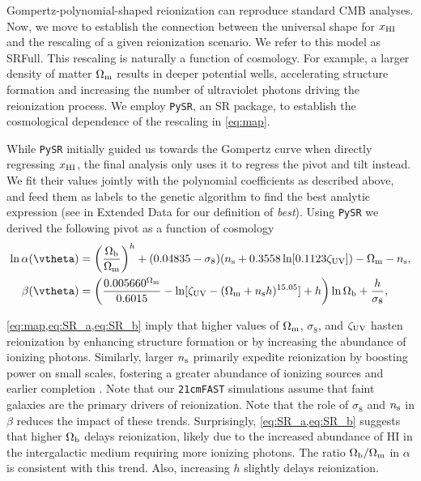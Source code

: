 Gompertz-polynomial-shaped reionization can reproduce standard CMB analyses.
Now, we move to establish the connection
between the universal shape for $x_{\mathrm{HI}}$ and the rescaling of a given
reionization scenario. We refer to this model as SRFull.
This rescaling is naturally a function of cosmology.
For example, a larger density of matter $\Omega_\mathrm{m}$ results in deeper
potential wells, accelerating structure formation and increasing the
number of ultraviolet photons driving the reionization process.
We employ \texttt{PySR}, an SR package, to establish the cosmological dependence
of the rescaling in \cref{eq:map}.

While \texttt{PySR} initially guided us towards the Gompertz curve when
directly regressing $x_{\mathrm{HI}}$, the final analysis only uses it to regress
the pivot and tilt instead.
We fit their values jointly with the polynomial coefficients as
described above, and feed them as labels to the genetic algorithm to
find the best analytic expression (see  in Extended
Data for our definition of \emph{best}).
Using \texttt{PySR} we derived the following pivot as a function of
cosmology
%
\begin{align}
\label{eq:SR_a}
\ln\ap(\vtheta) &= \left(\frac{\Omegab}{\Omegam}\right)^h + (0.04835 - \sigma_8) (\ns + 0.3558 \ln[0.1123 \zetaUV])  - \Omegam - \ns, \\
\label{eq:SR_b}
\beta(\vtheta) &=  \left( \frac{0.005660^{\Omegam}}{0.6015} - \ln[\zetaUV - (\Omegam + \ns h)^{15.05} ]+ h \right) \ln{\Omegab} + \frac{h}{\sigma_8},
\end{align} 

\cref{eq:map,eq:SR_a,eq:SR_b} imply that higher values of $\Omega_\mathrm{m}$, $\sigma_8$, 
and $\zeta_\mathrm{UV}$ hasten reionization by enhancing structure
formation or by increasing the abundance of ionizing photons. 
Similarly, larger $n_\mathrm{s}$ primarily expedite reionization by boosting
power on small scales, fostering a greater abundance of ionizing 
sources and earlier completion \cite{Montero2021}. Note that our 
\texttt{21cmFAST} simulations assume that faint galaxies
are the primary drivers of reionization. Note that the role of $\sigma_8$ 
and $n_\mathrm{s}$ in $\beta$ reduces the impact of these trends. 
Surprisingly, \cref{eq:SR_a,eq:SR_b} suggests that higher $\Omega_\mathrm{b}$ delays
reionization, likely due to the increased abundance of HI in the
intergalactic medium requiring more ionizing photons. 
The ratio $\Omega_\mathrm{b}/\Omega_\mathrm{m}$ in $\alpha$ is consistent
with this trend. Also, increasing $h$ slightly delays reionization.

